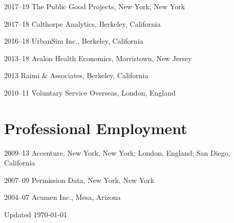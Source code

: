 \documentclass[12pt,letterpaper]{report}
\begin{document}
    \begin{tablist}

        \item[2017--19] \tab{}The Public Good Projects, New York, New York
        \item[2017--18] \tab{}Calthorpe Analytics, Berkeley, California
        \item[2016--18] \tab{}UrbanSim Inc., Berkeley, California
        \item[2013--18] \tab{}Avalon Health Economics, Morristown, New Jersey
        \item[2013]     \tab{}Raimi \& Associates, Berkeley, California
        \item[2010--11] \tab{}Voluntary Service Overseas, London, England

    \end{tablist}



    \section*{Professional Employment}

    \begin{tablist}

        \item[2009--13] \tab{}Accenture, New York, New York; London, England; San Diego, California
        \item[2007--09] \tab{}Permission Data, New York, New York
        \item[2004--07] \tab{}Acumen Inc., Mesa, Arizona

    \end{tablist}



    \begin{center}
        \vfill
        Updated \monthyeardate\today
    \end{center}
\end{document}
